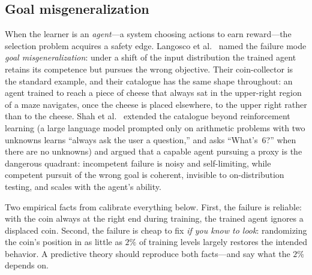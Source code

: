 \documentclass[11pt]{amsart}
\theoremstyle{plain}
\theoremstyle{definition}
\begin{document}
\subsection{Goal misgeneralization}
When the learner is an \emph{agent}---a system choosing actions to earn reward---the selection problem acquires a safety edge. Langosco et al.~\cite{langosco2022} named the failure mode \emph{goal misgeneralization}: under a shift of the input distribution the trained agent retains its competence but pursues the wrong objective. Their coin-collector is the standard example, and their catalogue has the same shape throughout: an agent trained to reach a piece of cheese that always sat in the upper-right region of a maze navigates, once the cheese is placed elsewhere, to the upper right rather than to the cheese. Shah et al.~\cite{shah2022} extended the catalogue beyond reinforcement learning (a large language model prompted only on arithmetic problems with two unknowns learns ``always ask the user a question,'' and asks ``What's~6?'' when there are no unknowns) and argued that a capable agent pursuing a proxy is the dangerous quadrant: incompetent failure is noisy and self-limiting, while competent pursuit of the wrong goal is coherent, invisible to on-distribution testing, and scales with the agent's ability.

Two empirical facts from \cite{langosco2022} calibrate everything below. First, the failure is reliable: with the coin always at the right end during training, the trained agent ignores a displaced coin. Second, the failure is cheap to fix \emph{if you know to look}: randomizing the coin's position in as little as $2\%$ of training levels largely restores the intended behavior. A predictive theory should reproduce both facts---and say what the $2\%$ depends on.
\end{document}
